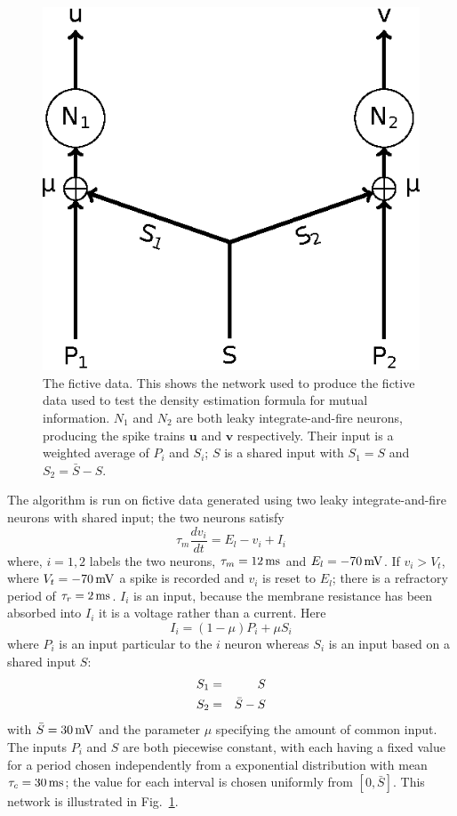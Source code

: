 \documentclass[12pt]{article}
\newcommand{\ms}{\mbox{\,ms}}
\newcommand{\mV}{\mbox{\,mV}}
\renewcommand{\u}{\mathbf{u}}
\renewcommand{\v}{\mathbf{v}}
\begin{document}
\begin{figure}[tp]
\begin{center}
\includegraphics{simulated_data}
\end{center}
\caption{The fictive data. This shows the network used to produce the
  fictive data used to test the density estimation formula for mutual
  information. $N_1$ and $N_2$ are both leaky integrate-and-fire
  neurons, producing the spike trains $\u$ and $\v$
  respectively. Their input is a weighted average of $P_i$ and $S_i$;
  $S$ is a shared input with $S_1=S$ and
  $S_2=\bar{S}-S$.\label{fig_network}}
\end{figure}

The algorithm is run on fictive data generated using two leaky
integrate-and-fire neurons with shared input; the two neurons satisfy
\begin{equation}
\tau_m \frac{dv_i}{dt}=E_l-v_i+I_i
\end{equation}
where, $i=1,2$ labels the two neurons, $\tau_m=12\ms$ and
$E_l=-70\mV$. If $v_i>V_t$, where $V_t=-70\mV$ a spike is recorded and
$v_i$ is reset to $E_l$; there is a refractory period of
$\tau_r=2\ms$. $I_i$ is an input, because the membrane resistance has
been absorbed into $I_i$ it is a voltage rather than a current. Here
\begin{equation}
I_i=(1-\mu) P_i +\mu S_i
\end{equation}
where $P_i$ is an input particular to the $i$ neuron whereas $S_i$ is an
input based on a shared input $S$:
\begin{eqnarray}
S_1&=&S\cr
S_2&=&\bar{S}-S
\end{eqnarray}
with $\bar{S}=30\mV$ and the parameter $\mu$ specifying the amount of
common input.  The inputs $P_i$ and $S$ are both piecewise constant,
with each having a fixed value for a period chosen independently from
a exponential distribution with mean $\tau_c=30\ms$; the value for
each interval is chosen uniformly from $[0,\bar{S}]$. This network is
illustrated in Fig.~\ref{fig_network}.
\end{document}
